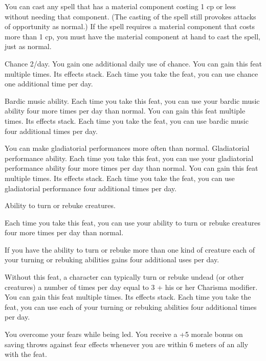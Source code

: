 {You can cast any spell that has a material component costing 1 cp or less without needing that component. (The casting of the spell still provokes attacks of opportunity as normal.) If the spell requires a material component that costs more than 1 cp, you must have the material component at hand to cast the spell, just as normal.}

{}
{Chance 2/day.}
{You gain one additional daily use of chance.}
{}{You can gain this feat multiple times. Its effects stack. Each time you take the feat, you can use chance one additional time per day.}

{}
{Bardic music ability.}
{Each time you take this feat, you can use your bardic music ability four more times per day than normal.}
{}
{You can gain this feat multiple times. Its effects stack. Each time you take the feat, you can use bardic music four additional times per day.}

{You can make gladiatorial performances more often than normal.}
{Gladiatorial performance ability.}
{Each time you take this feat, you can use your gladiatorial performance ability four more times per day than normal.}
{}
{You can gain this feat multiple times. Its effects stack. Each time you take the feat, you can use gladiatorial performance four additional times per day.}

{}
{Ability to turn or rebuke creatures.}
{Each time you take this feat, you can use your ability to turn or rebuke creatures four more times per day than normal.

If you have the ability to turn or rebuke more than one kind of creature each of your turning or rebuking abilities gains four additional uses per day.}
{Without this feat, a character can typically turn or rebuke undead (or other creatures) a number of times per day equal to 3 + his or her Charisma modifier.}
{You can gain this feat multiple times. Its effects stack. Each time you take the feat, you can use each of your turning or rebuking abilities four additional times per day.}

{You overcome your fears while being led.}{}
{You receive a +5 morale bonus on saving throws against fear effects whenever you are within 6 meters of an ally with the  feat.}{}{}



